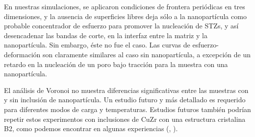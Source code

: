 En nuestras simulaciones, se aplicaron condiciones de frontera periódicas en tres dimensiones, y la ausencia de superficies libres deja sólo a la nanopartícula como probable concentrador de esfuerzo para promover la nucleación de STZs, y así desencadenar las bandas de corte, en la interfaz entre la matriz y la nanopartícula. Sin embargo, éste no fue el caso. Las curvas de esfuerzo-deformación son claramente similares al caso sin nanopartícula, a excepción de un retardo en la nucleación de un poro bajo tracción para la muestra con una nanopartícula.

El análisis de Voronoi no muestra diferencias significativas entre las muestras con y sin inclusión de nanopartícula. Un estudio futuro y más detallado es requerido para diferentes modos de carga y temperaturas. Estudios futuros también podrían repetir estos experimentos con inclusiones de CuZr con una estructura cristalina B2, como podemos encontrar en algunas experiencias (\cite{wei14}, \cite{kuo14}).